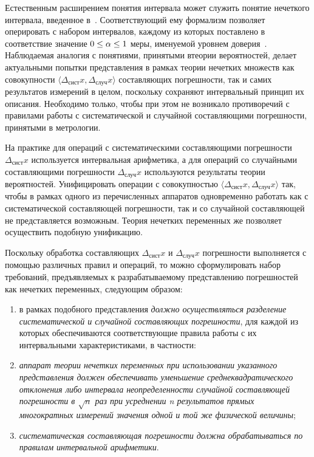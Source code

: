 \begin{multicols}{2}
  Естественным расширением понятия интервала может служить понятие 
нечеткого интервала, введенное в~\cite{1sem}. Соответствующий ему 
формализм позволяет оперировать с набором интервалов, каждому из которых 
поставлено в соответствие значение $0\hm\leq \alpha \hm\leq 1$ меры, 
именуемой уровнем доверия~\cite{10sem}. Наблюдаемая аналогия с понятиями, 
принятыми в\linebreak теории вероятностей, делает актуальными попытки 
представления в рамках теории нечетких множеств как совокупности $\langle 
\Delta_{\mathrm{сист}}x, \Delta_{\mathrm{случ}}x\rangle$ со\-став\-ля\-ющих 
погрешности, так и самих результатов\linebreak
измерений в целом, поскольку 
сохраняют интервальный принцип их описания. Необходимо только, чтобы при 
этом не возникало противоречий с правилами работы с 
систематической и случайной составляющими погрешности, принятыми в 
метрологии.
  
  На практике для операций с систематическими составляющими погрешности 
$\Delta_{\mathrm{сист}}x $ используется интервальная арифметика, а для 
операций со случайными составляющими погрешности 
$\Delta_{\mathrm{случ}}x$ используются результаты теории вероятностей. 
Унифицировать операции с совокупностью $\langle \Delta_{\mathrm{сист}}x, 
\Delta_{\mathrm{случ}}x\rangle$ так, чтобы в рамках одного из перечисленных 
аппаратов одновременно работать как с систематической составляющей 
погрешности, так и со случайной составляющей не представляется возможным. 
Теория нечетких переменных же позволяет осуществить подобную 
унификацию.
  
  Поскольку обработка составляющих $\Delta_{\mathrm{сист}}x $ и 
$\Delta_{\mathrm{случ}}x$ погрешности выполняется с помощью различных 
правил и операций, то можно сформулировать набор требований, 
предъявляемых к разрабатываемому представлению погрешностей как 
нечетких переменных, следующим образом: 
  \begin{enumerate}[(1)]
\item в рамках подобного представления \textit{должно осуществляться 
разделение систематической и случайной составляющих погрешности}, для 
каж\-дой из которых обеспечиваются соответствующие правила работы с их 
интервальными характеристиками, в частности: 
\item \textit{аппарат теории нечетких переменных при использовании 
указанного представления должен обеспечивать уменьшение 
среднеквадратического отклонения либо интервала неопределенности 
случайной составляющей погрешности в $\sqrt{n}$ раз при усреднении n 
результатов прямых многократных измерений значения одной и той же 
физической величины};
\item \textit{систематическая составляющая погрешности должна 
обрабатываться по правилам интервальной арифметики}.
\end{enumerate}


\end{multicols}
